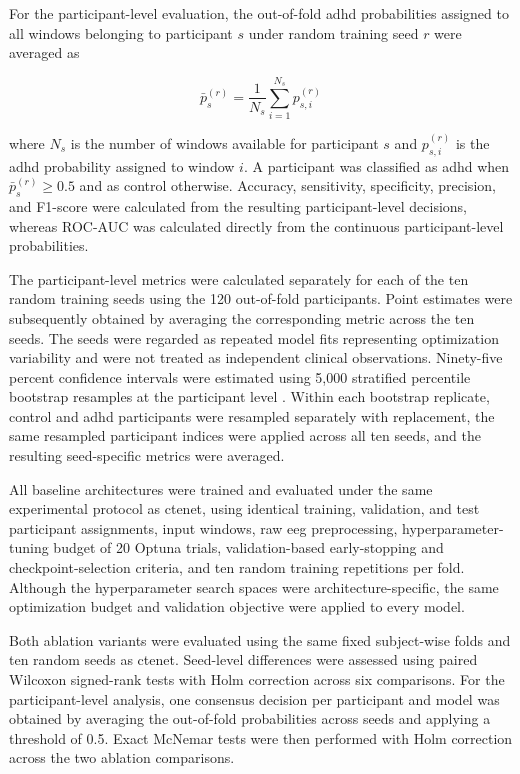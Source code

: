 {For the participant-level evaluation, the out-of-fold \gls{adhd} probabilities assigned to all windows belonging to participant $s$ under random training seed $r$ were averaged as}

\begin{equation}
{
\bar{p}_{s}^{(r)}
=
\frac{1}{N_s}
\sum_{i=1}^{N_s}
p_{s,i}^{(r)}
}
\label{eq:participant_probability}
\end{equation}

{where $N_s$ is the number of windows available for participant $s$ and $p_{s,i}^{(r)}$ is the \gls{adhd} probability assigned to window $i$. A participant was classified as \gls{adhd} when $\bar{p}_{s}^{(r)} \geq 0.5$ and as control otherwise. Accuracy, sensitivity, specificity, precision, and F1-score were calculated from the resulting participant-level decisions, whereas ROC-AUC was calculated directly from the continuous participant-level probabilities.}

{The participant-level metrics were calculated separately for each of the ten random training seeds using the 120 out-of-fold participants. Point estimates were subsequently obtained by averaging the corresponding metric across the ten seeds. The seeds were regarded as repeated model fits representing optimization variability and were not treated as independent clinical observations. Ninety-five percent confidence intervals were estimated using 5,000 stratified percentile bootstrap resamples at the participant level \cite{efron1979bootstrap}. Within each bootstrap replicate, control and \gls{adhd} participants were resampled separately with replacement, the same resampled participant indices were applied across all ten seeds, and the resulting seed-specific metrics were averaged.}

{All baseline architectures were trained and evaluated under the same experimental protocol as \gls{ctenet}, using identical training, validation, and test participant assignments, input windows, raw \gls{eeg} preprocessing, hyperparameter-tuning budget of 20 Optuna trials, validation-based early-stopping and checkpoint-selection criteria, and ten random training repetitions per fold. Although the hyperparameter search spaces were architecture-specific, the same optimization budget and validation objective were applied to every model.}

{Both ablation variants were evaluated using the same fixed subject-wise folds and ten random seeds as \gls{ctenet}. Seed-level differences were assessed using paired Wilcoxon signed-rank tests with Holm correction across six comparisons. For the participant-level analysis, one consensus decision per participant and model was obtained by averaging the out-of-fold probabilities across seeds and applying a threshold of 0.5. Exact McNemar tests \cite{mcnemar1947sampling} were then performed with Holm correction across the two ablation comparisons.}

